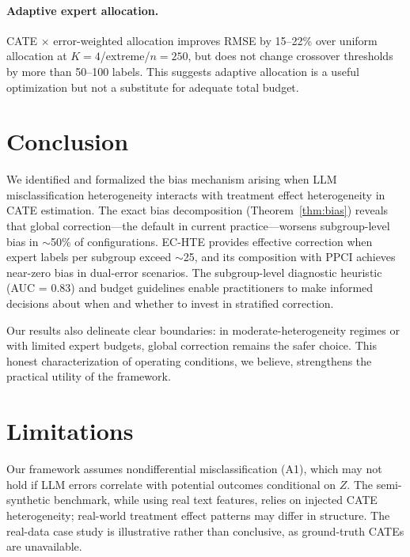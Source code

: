 \documentclass[11pt,a4paper]{article}
\begin{document}
\paragraph{Adaptive expert allocation.}
CATE $\times$ error-weighted allocation improves RMSE by 15--22\% over uniform allocation at $K=4$/extreme/$n=250$, but does not change crossover thresholds by more than 50--100 labels.
This suggests adaptive allocation is a useful optimization but not a substitute for adequate total budget.


\section{Conclusion}

We identified and formalized the bias mechanism arising when LLM misclassification heterogeneity interacts with treatment effect heterogeneity in CATE estimation.
The exact bias decomposition (Theorem~\ref{thm:bias}) reveals that global correction---the default in current practice---worsens subgroup-level bias in $\sim$50\% of configurations.
EC-HTE provides effective correction when expert labels per subgroup exceed $\sim$25, and its composition with PPCI achieves near-zero bias in dual-error scenarios.
The subgroup-level diagnostic heuristic (AUC = 0.83) and budget guidelines enable practitioners to make informed decisions about when and whether to invest in stratified correction.

Our results also delineate clear boundaries: in moderate-heterogeneity regimes or with limited expert budgets, global correction remains the safer choice.
This honest characterization of operating conditions, we believe, strengthens the practical utility of the framework.


\section*{Limitations}

Our framework assumes nondifferential misclassification (A1), which may not hold if LLM errors correlate with potential outcomes conditional on $Z$.
The semi-synthetic benchmark, while using real text features, relies on injected CATE heterogeneity; real-world treatment effect patterns may differ in structure.
The real-data case study is illustrative rather than conclusive, as ground-truth CATEs are unavailable.






\appendix
\end{document}
